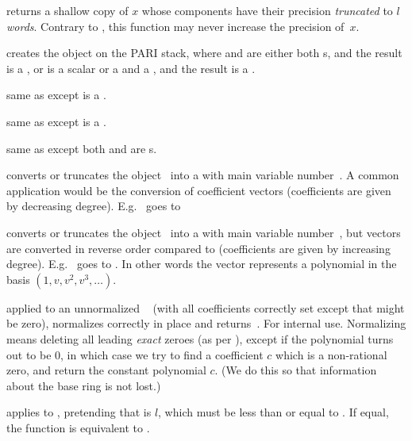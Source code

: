  returns a shallow copy of $x$ whose
 components have their precision \emph{truncated} to $l$
\emph{words}. Contrary to , this function may never increase
the precision of~$x$.


 creates the object  on
the PARI stack, where  and  are either both s, and the
result is a , or  is a scalar or a  and  a
, and the result is a .

 same as  except  is a
.

 same as  except  is a
.

 same as  except both
 and  are s.


 converts or truncates the object~
into a  with main variable number~. A common application
would be the conversion of coefficient vectors (coefficients are given by
decreasing degree). E.g.~\kbd{[2,3]} goes to 

 converts or truncates the object~
into a  with main variable number~, but vectors are converted
in reverse order compared to  (coefficients are given by
increasing degree). E.g.~\kbd{[2,3]} goes to . In other words
the vector represents a polynomial in the basis $(1,v,v^2,v^3,\dots)$.

 applied to an unnormalized ~
(with all coefficients correctly set except that  might
be zero), normalizes  correctly in place and returns~. For
internal use. Normalizing means deleting all leading \emph{exact} zeroes
(as per ), except if the polynomial turns out to be $0$,
in which case we try to find a coefficient $c$ which is a non-rational zero,
and return the constant polynomial $c$. (We do this so that information
about the base ring is not lost.)

 applies  to
, pretending that  is $l$, which must be less than
or equal to . If equal, the function is equivalent to
.

